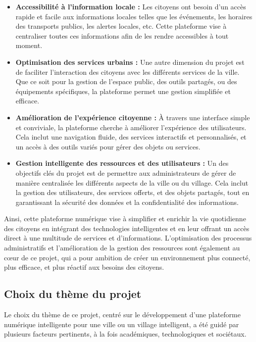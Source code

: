\documentclass[a4paper,12pt]{report}
\begin{document}
	\begin{itemize}
		\item \textbf{Accessibilité à l’information locale :} Les citoyens ont besoin d’un accès rapide et facile aux informations locales telles que les événements, les horaires des transports publics, les alertes locales, etc. Cette plateforme vise à centraliser toutes ces informations afin de les rendre accessibles à tout moment.
		\item \textbf{Optimisation des services urbains :} Une autre dimension du projet est de faciliter l’interaction des citoyens avec les différents services de la ville. Que ce soit pour la gestion de l’espace public, des outils partagés, ou des équipements spécifiques, la plateforme permet une gestion simplifiée et efficace.
		\item \textbf{Amélioration de l’expérience citoyenne :} À travers une interface simple et conviviale, la plateforme cherche à améliorer l’expérience des utilisateurs. Cela inclut une navigation fluide, des services interactifs et personnalisés, et un accès à des outils variés pour gérer des objets ou services.
		\item \textbf{Gestion intelligente des ressources et des utilisateurs :} Un des objectifs clés du projet est de permettre aux administrateurs de gérer de manière centralisée les différents aspects de la ville ou du village. Cela inclut la gestion des utilisateurs, des services offerts, et des objets partagés, tout en garantissant la sécurité des données et la confidentialité des informations.
	\end{itemize}
	
	Ainsi, cette plateforme numérique vise à simplifier et enrichir la vie quotidienne des citoyens en intégrant des technologies intelligentes et en leur offrant un accès direct à une multitude de services et d'informations. L’optimisation des processus administratifs et l'amélioration de la gestion des ressources sont également au cœur de ce projet, qui a pour ambition de créer un environnement plus connecté, plus efficace, et plus réactif aux besoins des citoyens.
	
	\subsection{Choix du thème du projet}
	
	Le choix du thème de ce projet, centré sur le développement d'une plateforme numérique intelligente pour une ville ou un village intelligent, a été guidé par plusieurs facteurs pertinents, à la fois académiques, technologiques et sociétaux.
	
\end{document}
